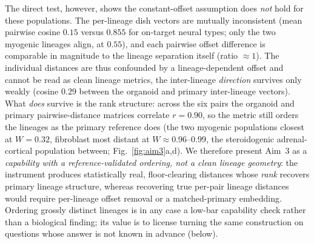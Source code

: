 \documentclass[11pt]{article}
\begin{document}
The direct test, however, shows the constant-offset assumption does \emph{not} hold for these
populations. The per-lineage dish vectors are mutually inconsistent (mean pairwise cosine $0.15$ versus
$0.855$ for on-target neural types; only the two myogenic lineages align, at $0.55$), and each pairwise
offset difference is comparable in magnitude to the lineage separation itself (ratio $\approx\!1$). The
individual distances are thus confounded by a lineage-dependent offset and cannot be read as clean
lineage metrics, the inter-lineage \emph{direction} survives only weakly (cosine $0.29$ between the
organoid and primary inter-lineage vectors). What \emph{does} survive is the rank structure: across the
six pairs the organoid and primary pairwise-distance matrices correlate $r=0.90$, so the metric still
orders the lineages as the primary reference does (the two myogenic populations closest at $W=0.32$,
fibroblast most distant at $W\approx0.96$--$0.99$, the steroidogenic adrenal-cortical population between;
Fig.~\ref{fig:aim3}a,d). We therefore present Aim~3 as a \emph{capability with a reference-validated
ordering, not a clean lineage geometry}: the instrument produces statistically real, floor-clearing
distances whose \emph{rank} recovers primary lineage structure, whereas recovering true per-pair lineage
distances would require per-lineage offset removal or a matched-primary embedding. Ordering grossly
distinct lineages is in any case a low-bar capability check rather than a biological finding; its value
is to license turning the same construction on questions whose answer is not known in advance (below).

\end{document}
